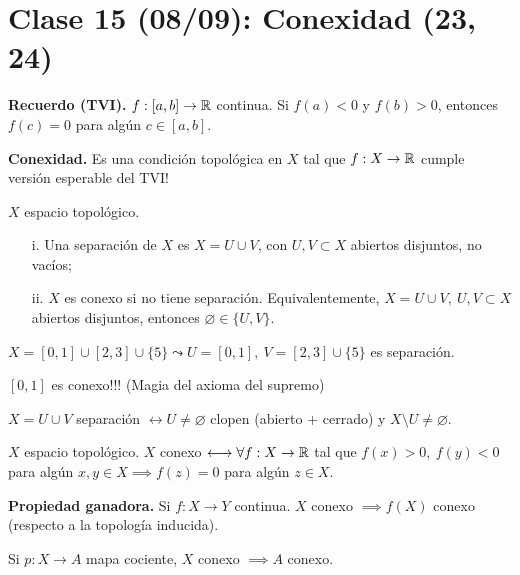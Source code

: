 \section{Clase 15 (08/09): Conexidad (23, 24)}

\textbf{Recuerdo (TVI).} $f: [a,b] \to \mathbb{R}$ continua. Si $f(a) < 0$ y $f(b) > 0$, entonces $f(c) = 0$ para algún $c \in [a,b]$. \newline

\noindent \textbf{Conexidad.} Es una condición topológica en $X$ tal que $f: X \to \mathbb{R}$ cumple versión esperable del TVI!

\begin{definition}
	$X$ espacio topológico.
	\begin{enumerate}
		\item[i.] Una separación de $X$ es $X = U \cup V$, con $U,V \subset X$ abiertos disjuntos, no vacíos;

		\item[ii.] $X$ es conexo si no tiene separación. Equivalentemente, $X = U \cup V,\ U,V \subset X$ abiertos disjuntos, entonces $\varnothing \in \{ U, V \}$.
	\end{enumerate}
\end{definition}
\smallskip
\begin{eg}[i.]
	$X = [0,1] \cup [2,3] \cup \{5\} \leadsto U = [0,1],\ V = [2,3] \cup \{5\}$ es separación.   
\end{eg}
\smallskip
\begin{eg}[ii.]
	$[0,1]$ es conexo!!! (Magia del axioma del supremo)
\end{eg}
\smallskip
\begin{remark}
	$X = U \cup V$ separación $\longleftrightarrow U \neq \varnothing$ clopen (abierto + cerrado) y $X \setminus U \neq \varnothing$.
\end{remark}

\begin{lemma}
	$X$ espacio topológico. $X$ conexo $\longleftrightarrow \forall f: X \to \mathbb{R}$ tal que $f(x) > 0,\ f(y) < 0$ para algún $x,y \in X \implies f(z) = 0$ para algún $z \in X$.
\end{lemma}
\medskip
\noindent \textbf{Propiedad ganadora.} Si $f: X \to Y$ continua. $X$ conexo $\implies f(X)$ conexo (respecto a la topología inducida).

\begin{corollary}
	Si $p:X \to A$ mapa cociente, $X$ conexo $\implies A$ conexo.
\end{corollary}


